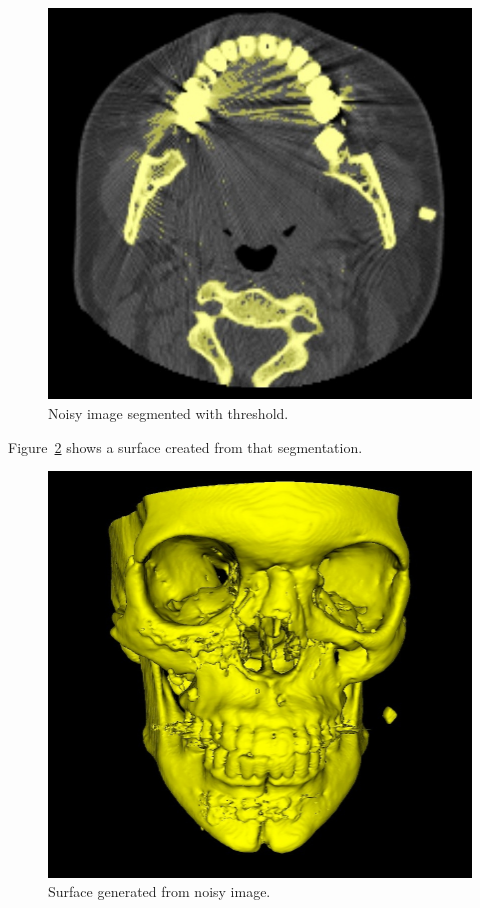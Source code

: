 \begin{figure}[!htb]
\centering
\includegraphics[scale=0.3]{../user_guide_figures/invesalius_screen/segmentation_manual_noise_amalgam.jpg}
\caption{Noisy image segmented with threshold.}
\label{fig:noise_amalgaman}
\end{figure}

Figure~\ref{fig:surface_amagaman} shows a surface created from that segmentation.

\begin{figure}[!htb]
\centering
\includegraphics[scale=0.3]{../user_guide_figures/invesalius_screen/segmentation_manual_noise_amalgam_3d.jpg}
\caption{Surface generated from noisy image.}
\label{fig:surface_amagaman}
\end{figure}

